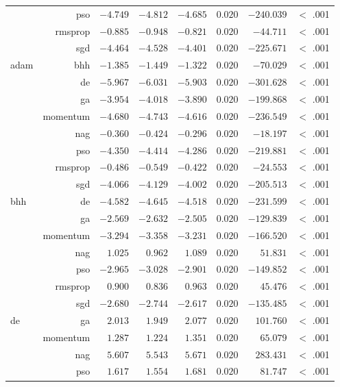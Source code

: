 \begin{table}[htbp]
{\begin{tabular}{lrrrrrrr}
			 & pso & $-4.749$ & $-4.812$ & $-4.685$ & $0.020$ & $-240.039$ & $<$ .001  \\
			 & rmsprop & $-0.885$ & $-0.948$ & $-0.821$ & $0.020$ & $-44.711$ & $<$ .001  \\
			 & sgd & $-4.464$ & $-4.528$ & $-4.401$ & $0.020$ & $-225.671$ & $<$ .001  \\
			adam & bhh & $-1.385$ & $-1.449$ & $-1.322$ & $0.020$ & $-70.029$ & $<$ .001  \\
			$ $ & de & $-5.967$ & $-6.031$ & $-5.903$ & $0.020$ & $-301.628$ & $<$ .001  \\
			 & ga & $-3.954$ & $-4.018$ & $-3.890$ & $0.020$ & $-199.868$ & $<$ .001  \\
			 & momentum & $-4.680$ & $-4.743$ & $-4.616$ & $0.020$ & $-236.549$ & $<$ .001  \\
			 & nag & $-0.360$ & $-0.424$ & $-0.296$ & $0.020$ & $-18.197$ & $<$ .001  \\
			 & pso & $-4.350$ & $-4.414$ & $-4.286$ & $0.020$ & $-219.881$ & $<$ .001  \\
			 & rmsprop & $-0.486$ & $-0.549$ & $-0.422$ & $0.020$ & $-24.553$ & $<$ .001  \\
			 & sgd & $-4.066$ & $-4.129$ & $-4.002$ & $0.020$ & $-205.513$ & $<$ .001  \\
			bhh & de & $-4.582$ & $-4.645$ & $-4.518$ & $0.020$ & $-231.599$ & $<$ .001  \\
			$ $ & ga & $-2.569$ & $-2.632$ & $-2.505$ & $0.020$ & $-129.839$ & $<$ .001  \\
			 & momentum & $-3.294$ & $-3.358$ & $-3.231$ & $0.020$ & $-166.520$ & $<$ .001  \\
			 & nag & $1.025$ & $0.962$ & $1.089$ & $0.020$ & $51.831$ & $<$ .001  \\
			 & pso & $-2.965$ & $-3.028$ & $-2.901$ & $0.020$ & $-149.852$ & $<$ .001  \\
			 & rmsprop & $0.900$ & $0.836$ & $0.963$ & $0.020$ & $45.476$ & $<$ .001  \\
			 & sgd & $-2.680$ & $-2.744$ & $-2.617$ & $0.020$ & $-135.485$ & $<$ .001  \\
			de & ga & $2.013$ & $1.949$ & $2.077$ & $0.020$ & $101.760$ & $<$ .001  \\
			$ $ & momentum & $1.287$ & $1.224$ & $1.351$ & $0.020$ & $65.079$ & $<$ .001  \\
			 & nag & $5.607$ & $5.543$ & $5.671$ & $0.020$ & $283.431$ & $<$ .001  \\
			 & pso & $1.617$ & $1.554$ & $1.681$ & $0.020$ & $81.747$ & $<$ .001  \\

\end{tabular}}
\end{table}
